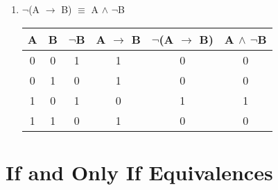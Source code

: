 \documentclass{report}
\begin{document}
\begin{enumerate}
  \item $\neg$(A $\to$ B) $\equiv$ A $\land$ $\neg$B



\begin{center}

  \begin{tabular}{| c | c | c | c | c | c |}

    \hline

    A & B & $\neg$B & A $\to$ B & $\neg$(A $\to$ B) & A $\land$ $\neg$B \\ \hline

    0 & 0 & 1 & 1 & 0 & 0 \\

    0 & 1 & 0 & 1 & 0 & 0 \\

    1 & 0 & 1 & 0 & 1 & 1 \\

    1 & 1 & 0 & 1 & 0 & 0 \\ \hline

  \end{tabular}

\end{center}

\end{enumerate}



\section{If and Only If Equivalences}
\end{document}
